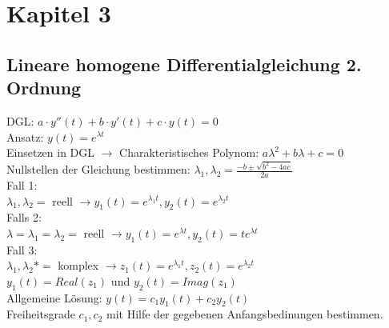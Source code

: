 \section{Kapitel 3}
\subsection{Lineare homogene Differentialgleichung 2. Ordnung}
DGL: $a \cdot y''(t) + b \cdot y'(t) + c \cdot y(t) = 0$\\
Ansatz: $y(t) = e^{\lambda t}$\\
Einsetzen in DGL $\rightarrow$ Charakteristisches Polynom: $a\lambda^2 + b\lambda +c =0$\\
Nullstellen der Gleichung bestimmen: $\lambda_1,\lambda_2 = \frac{-b \pm \sqrt{b^2 - 4ac}}{2a}$\\
Fall 1:\\ 
$\lambda_1,\lambda_2 =$ reell $\rightarrow y_1(t) = e^{\lambda_1 t}, y_2(t) = e^{\lambda_2 t}$\\
Falls 2:\\ 
$\lambda = \lambda_1 = \lambda_2 =$ reell $\rightarrow y_1(t) = e^{\lambda t}, y_2(t) = te^{\lambda t}$\\
Fall 3:\\ 
$\lambda_1,\lambda_2* =$ komplex $\rightarrow z_1(t) = e^{\lambda_1 t}, z_2(t) = e^{\lambda_2 t}$\\
$y_1(t) = Real(z_1)$ und $y_2(t) = Imag(z_1)$\\
Allgemeine Lösung: $y(t) = c_1y_1(t) + c_2y_2(t)$\\
Freiheitsgrade $c_1,c_2$ mit Hilfe der gegebenen Anfangsbedinungen bestimmen. 
